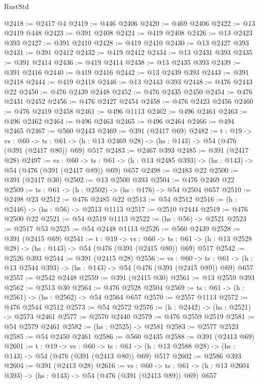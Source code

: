 \begin{lexlean}{RustStd}
\begin{coremodule}
@2418 := @2417 @4
@2419 := @446 @2406
@2420 := @469 @2406
@2422 := @13 @2419 @448
@2423 := @391 @2408
@2424 := @419 @2408
@2426 := @13 @2423 @393
@2427 := @391 @2410
@2428 := @419 @2410
@2430 := @13 @2427 @393
@2431 := @391 @2412
@2432 := @419 @2412
@2434 := @13 @2431 @393
@2435 := @391 @2414
@2436 := @419 @2414
@2438 := @13 @2435 @393
@2439 := @391 @2416
@2440 := @419 @2416
@2442 := @13 @2439 @393
@2443 := @391 @2418
@2444 := @419 @2418
@2446 := @13 @2443 @393
@2448 := @476 @2443 @22
@2450 := @476 @2439 @2448
@2452 := @476 @2435 @2450
@2454 := @476 @2431 @2452
@2456 := @476 @2427 @2454
@2458 := @476 @2423 @2456
@2460 := @476 @2419 @2458
@2461 := @496 @1113
@2462 := @496 @2461
@2463 := @496 @2462
@2464 := @496 @2463
@2465 := @496 @2464
@2466 := @494 @2465
@2467 := @560 @2443
@2469 := @391 (@2417 @69)
@2482 := {t : @19} ->
  {vs : @60} ->
  {ts : @61} -> (h : @13 @2469 @28) -> (hs : @143) -> @54 (@476 (@391 (@2417 @80)) @69) @517
@2483 := @2467 @393
@2485 := @391 (@2417 @28)
@2497 := {vs : @60} ->
  {ts : @61} -> (h : @13 @2485 @393) -> (hs : @143) -> @54 (@476 (@391 (@2417 @89)) @69) @657
@2498 := @2483 @22
@2500 := @391 (@2417 @30)
@2502 := @13 @2500 @393
@2504 := @476 @2469 @22
@2509 := {ts : @61} -> (h : @2502) -> (hs : @176) -> @54 @2504 @657
@2510 := @2498 @23
@2512 := @476 @2485 @22
@2513 := @54 @2512
@2516 := (h : @2446) -> (hs : @56) -> @2513 @1113
@2517 := @2510 @2444
@2519 := @476 @2500 @22
@2521 := @54 @2519 @1113
@2522 := (hs : @56) -> @2521
@2523 := @2517 @53
@2525 := @54 @2448 @1113
@2526 := @560 @2439
@2528 := @391 (@2415 @69)
@2541 := {t : @19} ->
  {vs : @60} ->
  {ts : @61} -> (h : @13 @2528 @28) -> (hs : @143) -> @54 (@476 (@391 (@2415 @80)) @69) @517
@2542 := @2526 @393
@2544 := @391 (@2415 @28)
@2556 := {vs : @60} ->
  {ts : @61} -> (h : @13 @2544 @393) -> (hs : @143) -> @54 (@476 (@391 (@2415 @89)) @69) @657
@2557 := @2542 @2448
@2559 := @391 (@2415 @30)
@2561 := @13 @2559 @393
@2562 := @2513 @30
@2564 := @476 @2528 @2504
@2569 := {ts : @61} -> (h : @2561) -> (hs : @2562) -> @54 @2564 @657
@2570 := @2557 @1113
@2572 := @476 @2544 @2512
@2573 := @54 @2572
@2576 := (h : @2442) -> (hs : @2521) -> @2573 @2461
@2577 := @2570 @2440
@2579 := @476 @2559 @2519
@2581 := @54 @2579 @2461
@2582 := (hs : @2525) -> @2581
@2583 := @2577 @2523
@2585 := @54 @2450 @2461
@2586 := @560 @2435
@2588 := @391 (@2413 @69)
@2601 := {t : @19} ->
  {vs : @60} ->
  {ts : @61} -> (h : @13 @2588 @28) -> (hs : @143) -> @54 (@476 (@391 (@2413 @80)) @69) @517
@2602 := @2586 @393
@2604 := @391 (@2413 @28)
@2616 := {vs : @60} ->
  {ts : @61} -> (h : @13 @2604 @393) -> (hs : @143) -> @54 (@476 (@391 (@2413 @89)) @69) @657

\end{coremodule}
\end{lexlean}
